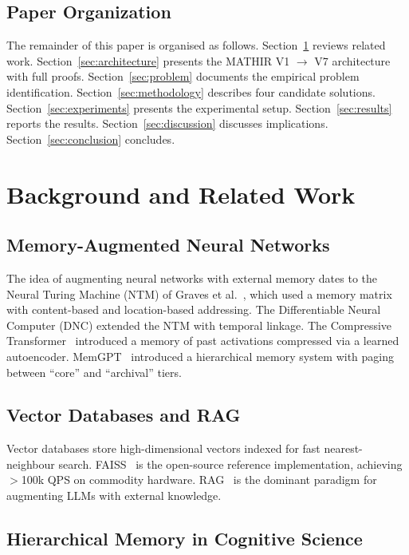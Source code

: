 \documentclass[12pt,a4paper]{article}
\theoremstyle{definition}
\theoremstyle{remark}
\newcommand{\MATHIR}{\textsc{MATHIR}}
\begin{document}
\subsection{Paper Organization}

The remainder of this paper is organised as follows. Section~\ref{sec:background} reviews related work. Section~\ref{sec:architecture} presents the \MATHIR{} V1 $\to$ V7 architecture with full proofs. Section~\ref{sec:problem} documents the empirical problem identification. Section~\ref{sec:methodology} describes four candidate solutions. Section~\ref{sec:experiments} presents the experimental setup. Section~\ref{sec:results} reports the results. Section~\ref{sec:discussion} discusses implications. Section~\ref{sec:conclusion} concludes.

\section{Background and Related Work}
\label{sec:background}

\subsection{Memory-Augmented Neural Networks}

The idea of augmenting neural networks with external memory dates to the Neural Turing Machine (NTM) of Graves et al.~\cite{graves2014}, which used a memory matrix with content-based and location-based addressing. The Differentiable Neural Computer (DNC) extended the NTM with temporal linkage. The Compressive Transformer~\cite{rae2020} introduced a memory of past activations compressed via a learned autoencoder. MemGPT~\cite{packer2023} introduced a hierarchical memory system with paging between ``core'' and ``archival'' tiers.

\subsection{Vector Databases and RAG}

Vector databases store high-dimensional vectors indexed for fast nearest-neighbour search. FAISS~\cite{johnson2019} is the open-source reference implementation, achieving $>$100k QPS on commodity hardware. RAG~\cite{lewis2020} is the dominant paradigm for augmenting LLMs with external knowledge.

\subsection{Hierarchical Memory in Cognitive Science}
\end{document}
